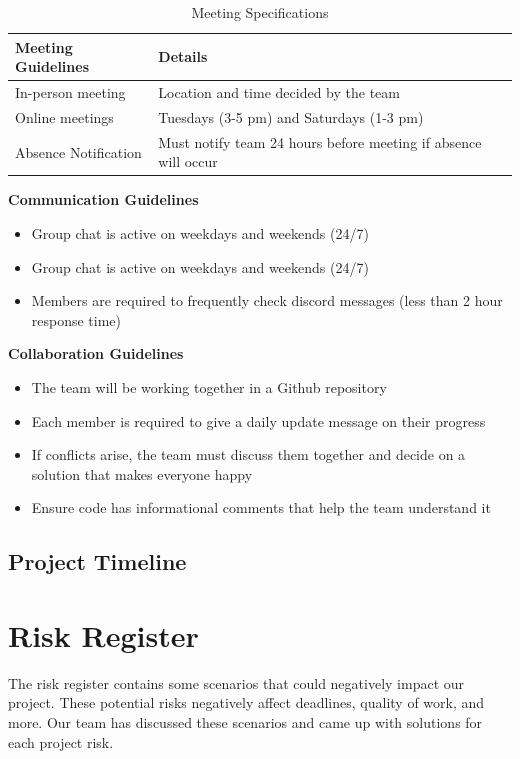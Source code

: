\documentclass{article} %
\begin{document}
\begin{table}[H]
\caption{Meeting Specifications}
\begin{center}
\begin{tabular}{|l|l|}
\hline
\textbf{Meeting Guidelines} & \textbf{Details} \\ \hline
In-person meeting           & Location and time decided by the team \\ \hline
Online meetings             & Tuesdays (3-5 pm) and Saturdays (1-3 pm) \\ \hline
Absence Notification        & Must notify team 24 hours before meeting if absence will occur \\ \hline
\end{tabular}
\end{center}
\end{table}

\textbf{Communication Guidelines}
\begin{itemize}
  \item Group chat is active on weekdays and weekends (24/7)
  \item Group chat is active on weekdays and weekends (24/7)
  \item Members are required to frequently check discord messages (less than 2 hour response time)
\end{itemize}

\textbf{Collaboration Guidelines}
\begin{itemize}
  \item The team will be working together in a Github repository
  \item Each member is required to give a daily update message on their progress
  \item If conflicts arise, the team must discuss them together and decide on a solution that makes everyone happy
  \item Ensure code has informational comments that help the team understand it
\end{itemize}

\subsection{Project Timeline}



\section{Risk Register}
The risk register contains some scenarios that could negatively impact our project. 
These potential risks negatively affect deadlines, quality of work, and more. Our team has 
discussed these scenarios and came up with solutions for each project risk. 
\end{document}
